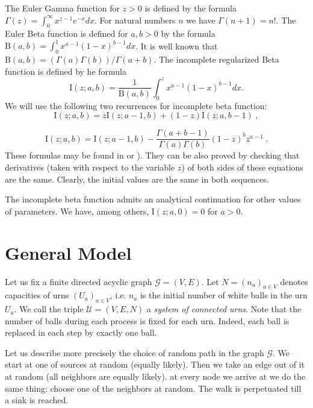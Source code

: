 \documentclass[submission]{dmtcs}
\newcommand{\Beta}[2]{\mathrm{B}(#1,#2)}
\newcommand{\IBETAREG}[3]{\mathrm{I}\left(#1;#2,#3\right)}
\begin{document}
The Euler Gamma function for $z>0$ is defined by the formula 
$\Gamma(z) = \int_{0}^{\infty} x^{z-1} e^{-x} dx$. For natural numbers $n$ we have
$\Gamma(n+1) = n!$. 
The Euler Beta function is defined for $a,b>0$ by the formula
$\Beta{a}{b} = \int_{0}^{1}x^{a-1}(1-x)^{b-1} dx$. It is well known that 
$\Beta{a}{b} = (\Gamma(a)\Gamma(b))/\Gamma(a+b)$.
The incomplete regularized Beta function is defined by he formula
$$
  \IBETAREG{z}{a}{b} = \frac{1}{\Beta{a}{b}} \int_{0}^{z} x^{a-1}(1-x)^{b-1} dx.
$$
We will use the following two recurrences for incomplete beta function:
\begin{equation}
  \label{icb:rec01}
  \IBETAREG{z}{a}{b} = z \IBETAREG{z}{a-1}{b} + (1-z) \IBETAREG{z}{a}{b-1} ~,
\end{equation}

\begin{equation}
  \label{icb:rec02}
  \IBETAREG{z}{a}{b} = 
  \IBETAREG{z}{a-1}{b} - \frac{\Gamma(a+b-1)}{\Gamma(a)\Gamma(b)} (1-z)^b z^{a-1}~. 
\end{equation}
These formulas may be found in \cite{WolframFS} or \cite{DLMF}). 
They can be also proved by checking that derivatives (taken with respect to the variable $z$)
of both sides of these equations are the same. Clearly, the initial values are the same in both 
sequences.

The incomplete beta function admits an analytical continuation for other values
of parameters. We have, among others, $\IBETAREG{z}{a}{0}=0$ for $a>0$.


\section{General Model}\label{General}

Let us fix a finite directed acyclic graph  $\mathcal{G} = (V,E)$.
Let $N=(n_a)_{a\in V}$ denotes capacities of urns $(U_a)_{a\in V}$, 
i.e. $n_a$ is the initial number of white balls in the urn $U_a$.
We call the triple $\mathcal{U} = (V,E,N)$ 
a \textit{system of connected urns}. Note that the number of balls during each process is 
fixed for each urn. Indeed, each ball is replaced in each step by exactly one ball. 



Let us describe more precisely the choice of random path  in the graph $\mathcal{G}$.
We start at one of sources at random (equally likely). Then we take an edge out of it
at random (all neighbors are equally likely). at every node we arrive at
we do the same thing: choose one of the neighbors at random. The
walk is perpetuated till a sink is reached.
  
\end{document}
